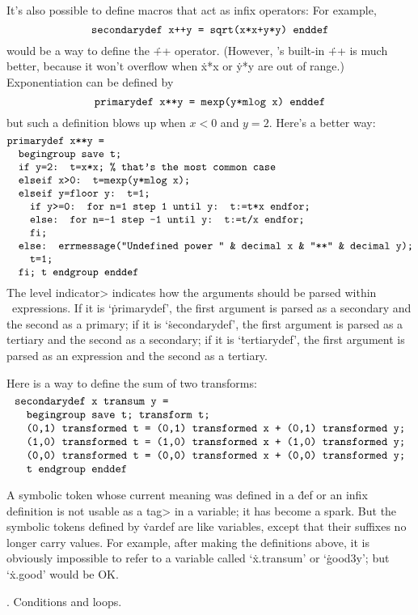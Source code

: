It's also possible to define macros that act as infix operators:
For example,
$$\hbox{\tt secondarydef x++y = sqrt(x*x+y*y) enddef}$$
would be a way to define the \.{++} operator. (However, \MF's built-in
\.{++} is much better, because it won't overflow when \.{x*x} or \.{y*y}
are out of range.) Exponentiation can be defined by
$$\hbox{\tt primarydef x**y = mexp(y*mlog x) enddef}$$
but such a definition blows up when $x<0$ and $y=2$. Here's a better way:
$$\vcenter{\halign{\tt#\hfil\cr
primarydef x**y =\cr
\ \ begingroup save t;\cr
\ \ if y=2: t=x*x; \% that's the most common case\cr
\ \ elseif x>0: t=mexp(y*mlog x);\cr
\ \ elseif y=floor y: t=1;\cr
\ \ \ \ if y>=0: for n=1 step 1 until y:  t:=t*x endfor;\cr
\ \ \ \ else: for n=-1 step -1 until y: t:=t/x endfor;\cr
\ \ \ \ fi;\cr
\ \ else: errmessage("Undefined power " \& decimal x \& "**" \& decimal y);\cr
\ \ \ \ t=1;\cr
\ \ fi; t endgroup enddef\cr}}$$
The \<level indicator> indicates how the arguments should be parsed
within \MF\ expressions.  If it is `\.{primarydef}', the first argument is
parsed as a secondary and the second as a primary; if it is
`\.{secondarydef}', the first argument is parsed as a tertiary and the
second as a secondary; if it is `\.{tertiarydef}', the first argument is
parsed as an expression and the second as a tertiary.

Here is a way to define the sum of two transforms:
$$\vcenter{\halign{\tt#\hfil\cr
secondarydef x transum y =\cr
\ \ begingroup save t; transform t;\cr
\ \ (0,1) transformed t = (0,1) transformed x + (0,1) transformed y;\cr
\ \ (1,0) transformed t = (1,0) transformed x + (1,0) transformed y;\cr
\ \ (0,0) transformed t = (0,0) transformed x + (0,0) transformed y;\cr
\ \ t endgroup enddef\cr}}$$

A symbolic token whose current meaning was defined in a \.{def} or an
infix definition is not usable as a \<tag> in a variable; it has become
a spark. But the symbolic tokens defined by \.{vardef} are like
variables, except that their suffixes no longer carry values. For example,
after making the definitions above, it is obviously impossible to refer
to a variable called `\.{x.transum}' or `\.{good3y}'; but `\.{x.good}'
would be OK.

. Conditions and loops.

